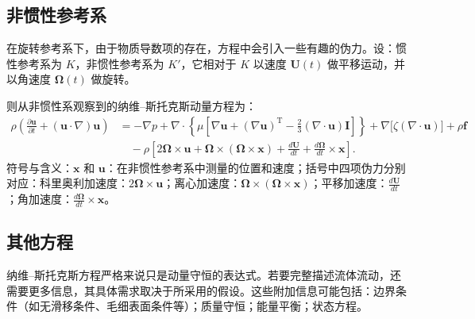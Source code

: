 \subsection{非惯性参考系}
在旋转参考系下，由于物质导数项的存在，方程中会引入一些有趣的伪力。设：惯性参考系为 $K$，非惯性参考系为 $K'$，它相对于 $K$ 以速度 $\mathbf{U}(t)$ 做平移运动，并以角速度 $\mathbf{\Omega}(t)$ 做旋转。

则从非惯性系观察到的纳维–斯托克斯动量方程为：
$$
\begin{aligned}
\rho \left(
\frac{\partial \mathbf{u}}{\partial t}
+ (\mathbf{u} \cdot \nabla) \mathbf{u}
\right)
&= -\nabla p
+ \nabla \cdot 
\left\{
\mu \left[
\nabla \mathbf{u}
+ (\nabla \mathbf{u})^{\mathrm{T}}
-\frac{2}{3}(\nabla \cdot \mathbf{u}) \mathbf{I}
\right]
\right\}
+ \nabla \big[\zeta (\nabla \cdot \mathbf{u})\big]
+ \rho \mathbf{f} \\
&\quad - \rho
\left[
2 \mathbf{\Omega} \times \mathbf{u}
+ \mathbf{\Omega} \times (\mathbf{\Omega} \times \mathbf{x})
+ \frac{d\mathbf{U}}{dt}
+ \frac{d\mathbf{\Omega}}{dt} \times \mathbf{x}
\right].
\end{aligned}~
$$
符号与含义：$\mathbf{x}$ 和 $\mathbf{u}$：在非惯性参考系中测量的位置和速度；括号中四项伪力分别对应：科里奥利加速度：$2 \mathbf{\Omega} \times \mathbf{u}$；离心加速度：$\mathbf{\Omega} \times (\mathbf{\Omega} \times \mathbf{x})$；平移加速度：$\frac{d\mathbf{U}}{dt}$；角加速度：$\frac{d\mathbf{\Omega}}{dt} \times \mathbf{x}$。
\subsection{其他方程}
纳维–斯托克斯方程严格来说只是动量守恒的表达式。若要完整描述流体流动，还需要更多信息，其具体需求取决于所采用的假设。这些附加信息可能包括：边界条件（如无滑移条件、毛细表面条件等）；质量守恒；能量平衡；状态方程。

